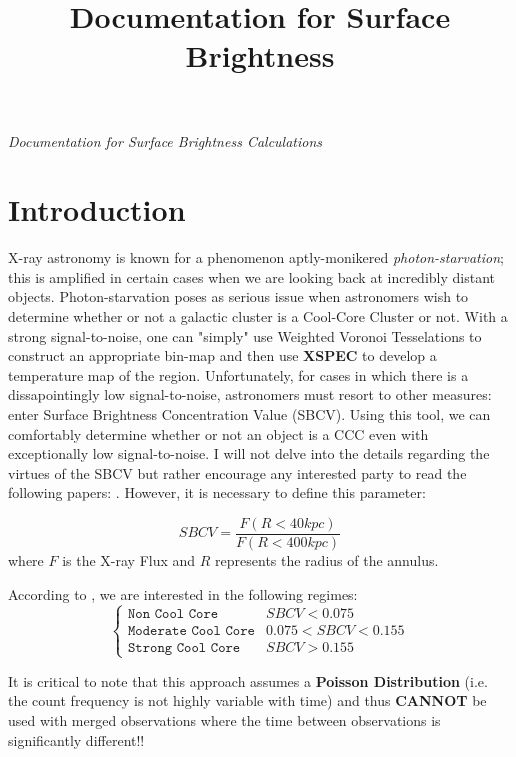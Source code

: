 \documentclass[11pt,letterpaper]{article}
\begin{document}
	\univlogo
	
	\title{Documentation for Surface Brightness}
	
	\textit{Documentation for Surface Brightness Calculations}
	
	\tableofcontents
	
	\newpage
	
	
	\newpage
\section{Introduction}
X-ray astronomy is known for a phenomenon aptly-monikered \textit{photon-starvation}; this is amplified in certain cases when we are looking back at incredibly distant objects. Photon-starvation poses as serious issue when astronomers wish to determine whether or not a galactic cluster is a Cool-Core Cluster or not. With a strong signal-to-noise, one can "simply" use Weighted Voronoi Tesselations to construct an appropriate bin-map and then use \textbf{XSPEC} to develop a temperature map of the region. Unfortunately, for cases in which there is a dissapointingly low signal-to-noise, astronomers must resort to other measures: enter Surface Brightness Concentration Value (SBCV). Using this tool, we can comfortably determine whether or not an object is a CCC even with exceptionally low signal-to-noise. I will not delve into the details regarding the virtues of the SBCV but rather encourage any interested party to read the following papers: \cite{Santos2018} \cite{Santos2018a} \cite{Semler2012}. However, it is necessary to define this parameter:

\begin{equation}
	SBCV = \frac{F(R<40kpc)}{F(R<400kpc)}
\end{equation}
where $F$ is the X-ray Flux and $R$ represents the radius of the annulus.

According to \cite{Semler2012}, we are interested in the following regimes:
\[ \begin{cases} 
\texttt{Non Cool Core} & SBCV < 0.075 \\
\texttt{Moderate Cool Core} & 0.075 < SBCV < 0.155 \\
\texttt{Strong Cool Core} & SBCV > 0.155 
\end{cases}
\] 

It is critical to note that this approach assumes a \textbf{Poisson Distribution} (i.e. the count frequency is not highly variable with time) and thus \textbf{CANNOT} be used with merged observations where the time between observations is significantly different!!
\end{document}

